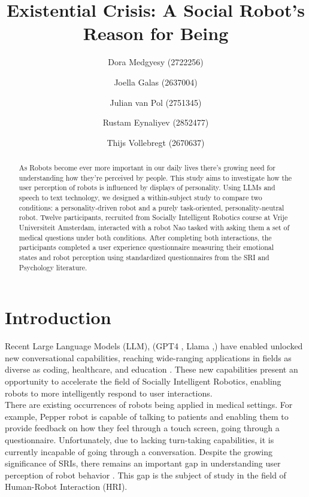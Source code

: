 \documentclass[runningheads]{llncs}
\begin{document}
\title{Existential Crisis: A Social Robot's Reason for Being}

\author{Dora Medgyesy (2722256)\and Joella Galas (2637004) \and Julian van Pol (2751345) \and
Rustam Eynaliyev (2852477)\and Thijs Vollebregt (2670637)}


\maketitle

\begin{abstract}
As Robots become ever more important in our daily lives there's growing need for understanding how they're perceived by people. This study aims to investigate how the user perception of robots is influenced by displays of personality. Using LLMs and speech to text technology, we designed a within-subject study to compare two conditions: a personality-driven robot and a purely task-oriented, personality-neutral robot. Twelve participants, recruited from Socially Intelligent Robotics course at Vrije Universiteit Amsterdam, interacted with a robot Nao tasked with asking them a set of medical questions under both conditions. After completing both interactions, the participants completed a user experience questionnaire measuring their emotional states and robot perception using standardized questionnaires from the SRI and Psychology literature.
\end{abstract}

\section{Introduction}

Recent Large Language Models (LLM), (GPT4 \cite{GPT4}, Llama \cite{Llama2024},) have enabled unlocked new conversational capabilities, reaching wide-ranging applications in fields as diverse as coding, healthcare, and education \cite{Leng2024}. These new capabilities present an opportunity to accelerate the field of Socially Intelligent Robotics, enabling robots to more intelligently respond to user interactions.\\

There are existing occurrences of robots being applied in medical settings. For example, Pepper robot \cite{Pepper} is capable of talking to patients and enabling them to provide feedback on how they feel through a touch screen, going through a questionnaire. Unfortunately, due to lacking turn-taking capabilities, it is currently incapable of going through a conversation. Despite the growing significance of SRIs, there remains an important gap in understanding user perception of robot behavior \cite{Mileounis2015}. This gap is the subject of study in the field of Human-Robot Interaction (HRI).\\
\end{document}
